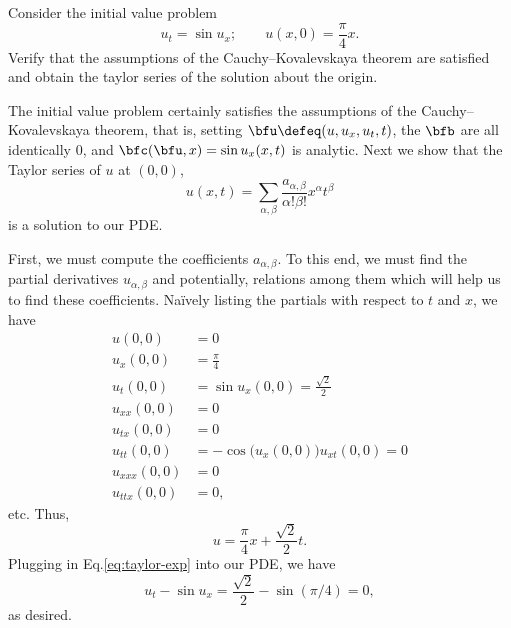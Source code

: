 \begin{problem}
  Consider the initial value problem
  \[
    u_t=\sin u_x;\qquad u(x,0)=\frac{\pi}{4}x.
  \]
  Verify that the assumptions of the Cauchy--Kovalevskaya theorem are
  satisfied and obtain the taylor series of the solution about the origin.
\end{problem}
\begin{solution}
  The initial value problem certainly satisfies the assumptions of the
  Cauchy--Kovalevskaya theorem, that is, setting
  \(\bfu\defeq(u,u_x,u_t,t)\), the \(\bfb\) are all identically \(0\), and
  \(\bfc(\bfu,x)=\sin u_x(x,t)\) is analytic. Next we show that the Taylor
  series of \(u\) at \((0,0)\),
  \[
    u(x,t)=\sum_{\alpha,\beta} \frac{a_{\alpha,\beta}}{\alpha!\beta!}
    x^\alpha t^\beta
  \]
  is a solution to our PDE.

  First, we must compute the coefficients \(a_{\alpha,\beta}\). To this
  end, we must find the partial derivatives \(u_{\alpha,\beta}\) and
  potentially, relations among them which will help us to find these
  coefficients. Naïvely listing the partials with respect to \(t\) and
  \(x\), we have
  \begin{align*}
    u(0,0)&=0\\
    u_x(0,0)&=\frac{\pi}{4}\\
    u_t(0,0)&=\sin u_x(0,0)=\frac{\sqrt{2}}{2}\\
    u_{xx}(0,0)&=0\\
    u_{tx}(0,0)&=0\\
    u_{tt}(0,0)&=-\cos\bigl(u_x(0,0)\bigr)u_{xt}(0,0)=0\\
    u_{xxx}(0,0)&=0\\
    u_{ttx}(0,0)&=0,
  \end{align*}
  etc. Thus,
  \begin{equation}
    \label{eq:taylor-exp}
    u=\frac{\pi}{4}x+\frac{\sqrt{2}}{2}t.
  \end{equation}
  Plugging in Eq.\@ \eqref{eq:taylor-exp} into our PDE, we have
  \[
    u_t-\sin u_x=\frac{\sqrt{2}}{2}-\sin(\pi/4)=0,
  \]
  as desired.
\end{solution}
\newpage

